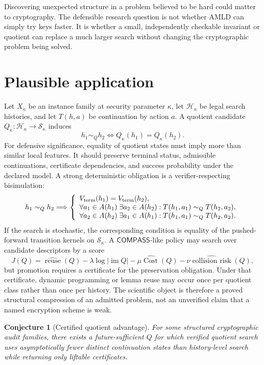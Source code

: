 \documentclass[11pt,oneside]{book}
\newtheorem{conjecture}[theorem]{Conjecture}
\theoremstyle{definition}
\theoremstyle{remark}
\newcommand{\COMPASS}{\mathsf{COMPASS}}
\newcommand{\Cost}{\operatorname{Cost}}
\begin{document}
Discovering unexpected structure in a problem believed to be hard could matter to cryptography.
The defensible research question is not whether AMLD can simply try keys faster. It is whether a
small, independently checkable invariant or quotient can replace a much larger search without
changing the cryptographic problem being solved.

\section{Plausible application}
Let \(X_\kappa\) be an instance family at security parameter \(\kappa\), let \(\mathcal H_\kappa\)
be legal search histories, and let \(T(h,a)\) be continuation by action \(a\). A quotient candidate
\(Q_\kappa:\mathcal H_\kappa\to\mathcal S_\kappa\) induces
\[
h_1\sim_Qh_2\iff Q_\kappa(h_1)=Q_\kappa(h_2).
\]
For defensive significance, equality of quotient states must imply more than similar local features.
It should preserve terminal status, admissible continuations, certificate dependencies, and success
probability under the declared model. A strong deterministic obligation is a verifier-respecting
bisimulation:
\[
h_1\sim_Qh_2\Longrightarrow
\left\{
\begin{array}{l}
V_{\rm term}(h_1)=V_{\rm term}(h_2),\\
\forall a_1\in A(h_1)\;\exists a_2\in A(h_2):T(h_1,a_1)\sim_QT(h_2,a_2),\\
\forall a_2\in A(h_2)\;\exists a_1\in A(h_1):T(h_1,a_1)\sim_QT(h_2,a_2).
\end{array}\right.
\]
If the search is stochastic, the corresponding condition is equality of the pushed-forward
transition kernels on \(\mathcal S_\kappa\). A \(\COMPASS\)-like policy may search over candidate
descriptors by a score
\[
J(Q)=\widehat{\operatorname{reuse}}(Q)-\lambda\log|\operatorname{im}Q|
-\mu\widehat{\Cost}(Q)-\nu\widehat{\operatorname{collision\ risk}}(Q),
\]
but promotion requires a certificate for the preservation obligation. Under that certificate, dynamic
programming or lemma reuse may occur once per quotient class rather than once per history. The
scientific object is therefore a proved structural compression of an admitted problem, not an
unverified claim that a named encryption scheme is weak.

\begin{conjecture}[Certified quotient advantage]
For some structured cryptographic audit families, there exists a future-sufficient \(Q\) for which
verified quotient search uses asymptotically fewer distinct continuation states than history-level
search while returning only liftable certificates.
\end{conjecture}
\end{document}
